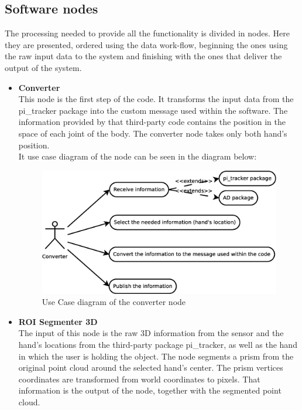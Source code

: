 \subsection{Software nodes}

The processing needed to provide all the functionality is divided in nodes. Here they are presented, ordered using the data work-flow, beginning the ones using the raw input data to the system and finishing with the ones that deliver the output of the system. 
\\

\begin{itemize}
	\item{\textbf{\large Converter}}\\
This node is the first step of the code. It transforms the input data from the pi\_tracker package into the custom message used within the software. The information provided by that third-party code contains the position in the space of each joint of the body. The converter node takes only both hand's position. 
\\

It use case diagram of the node can be seen in the diagram below: 

\begin{figure}[h]
	\begin{center}
\includegraphics[scale=0.2]{img/diagrams/uc_converter.eps}
	\caption[Use case diagram converter node]{Use Case diagram of the converter node}
	\end{center}
\end{figure}

	
	\item{\textbf{ROI Segmenter 3D}}\\
The input of this node is the raw 3D information from the sensor and the hand's locations from the third-party package pi\_tracker, as well as the hand in which the user is holding the object. The node segments a prism from the original point cloud around the selected hand's center. The prism vertices coordinates are transformed from world coordinates to pixels. That information is the output of the node, together with the segmented point cloud. 


\end{itemize}
